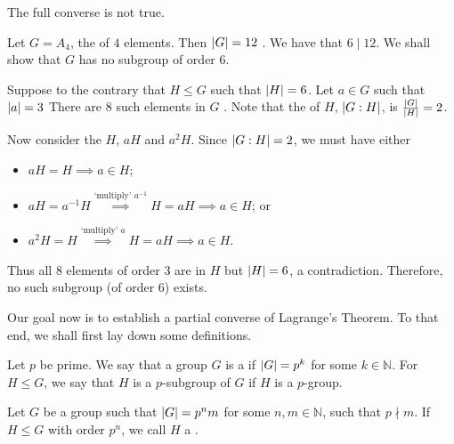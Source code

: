 \documentclass[notoc,notitlepage,nobib]{tufte-book}
\begin{document}
The full converse is not true.

\begin{eg}
  Let $G = A_4$, the  of $4$ elements. Then $\left|G\right|
  = 12$ . We have
  that $6 \mid 12$. We shall show that $G$ has no subgroup of order $6$.

  Suppose to the contrary that $H \leq G$ such that $\left|H\right| = 6$. Let $a \in G$
  such that $\left|a\right| = 3$  There are $8$ such elements in $G$ . Note that the  of $H$, $\left|G : H\right|$, is
  $\frac{\left|G\right|}{\left|H\right|} = 2$.

  Now consider the  $H$, $aH$ and $a^2 H$. Since $\left|G : H\right| =
  2$, we must have either
  \begin{itemize}
    \item $aH = H \implies a \in H$;
    \item $aH = a^{-1}H \overset{\text{`multiply' } a^{-1}}{\implies} H = aH \implies a \in H$; or
    \item $a^2H = H \overset{\text{`multiply' } a}{\implies} H = aH \implies a \in H$.
  \end{itemize}
  Thus all $8$ elements of order $3$ are in $H$ but $\left|H\right| = 6$, a
  contradiction. Therefore, no such subgroup (of order $6$) exists.
\end{eg}

Our goal now is to establish a partial converse of Lagrange's Theorem. To that
end, we shall first lay down some definitions.

\begin{defn}[$p$-Group]\label{defn:_p_group}
  Let $p$ be prime. We say that a group $G$ is a  if $\left|G\right|
  = p^k$ for some $k \in \mathbb{N}$. For $H \leq G$, we say that $H$ is a
  $p$-subgroup of $G$ if $H$ is a $p$-group.
\end{defn}

\begin{defn}\label{defn:sylow_p_subgroup}
  Let $G$ be a group such that $\left|G\right| = p^n m$ for some $n, m \in \mathbb{N}$,
  such that $p \nmid m$. If $H \leq G$ with order $p^n$, we call $H$ a
  .
\end{defn}
\end{document}
